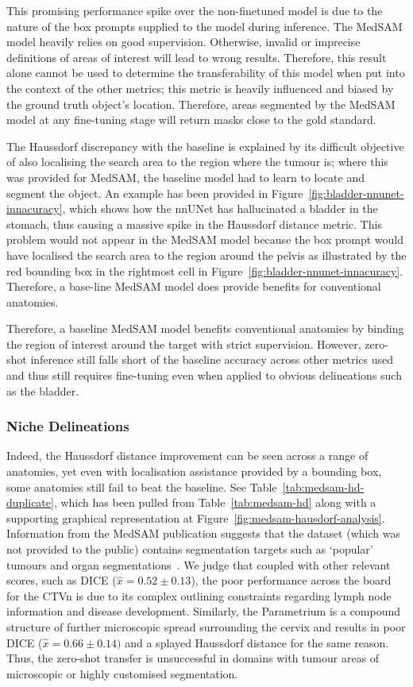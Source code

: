 \documentclass[11pt,twoside]{report}
\begin{document}
This promising performance spike over the non-finetuned model is due to the nature of the box prompts supplied to the model during inference. The MedSAM model heavily relies on good supervision. Otherwise, invalid or imprecise definitions of areas of interest will lead to wrong results. Therefore, this result alone cannot be used to determine the transferability of this model when put into the context of the other metrics; this metric is heavily influenced and biased by the ground truth object's location. Therefore, areas segmented by the MedSAM model at any fine-tuning stage will return masks close to the gold standard.

The Haussdorf discrepancy with the baseline is explained by its difficult objective of also localising the search area to the region where the tumour is; where this was provided for MedSAM, the baseline model had to learn to locate and segment the object. An example has been provided in Figure~\ref{fig:bladder-nnunet-innacuracy}, which shows how the nnUNet has hallucinated a bladder in the stomach, thus causing a massive spike in the Haussdorf distance metric. This problem would not appear in the MedSAM model because the box prompt would have localised the search area to the region around the pelvis as illustrated by the red bounding box in the rightmost cell in Figure~\ref{fig:bladder-nnunet-innacuracy}. Therefore, a base-line MedSAM model does provide benefits for conventional anatomies.


Therefore, a baseline MedSAM model benefits conventional anatomies by binding the region of interest around the target with strict supervision. However, zero-shot inference still falls short of the baseline accuracy across other metrics used and thus still requires fine-tuning even when applied to obvious delineations such as the bladder.

\subsubsection{Niche Delineations}

Indeed, the Haussdorf distance improvement can be seen across a range of anatomies, yet even with localisation assistance provided by a bounding box, some anatomies still fail to beat the baseline. See Table~\ref{tab:medsam-hd-duplicate}, which has been pulled from Table~\ref{tab:medsam-hd} along with a supporting graphical representation at Figure~\ref{fig:medsam-hausdorf-analysis}. Information from the MedSAM publication suggests that the dataset (which was not provided to the public) contains segmentation targets such as `popular' tumours and organ segmentations~\cite{Ma2024}. We judge that coupled with other relevant scores, such as DICE ($\hat{x} = 0.52 \pm 0.13$), the poor performance across the board for the CTVn is due to its complex outlining constraints regarding lymph node information and disease development. Similarly, the Parametrium is a compound structure of further microscopic spread surrounding the cervix and results in poor DICE ($\hat{x} = 0.66 \pm 0.14)$ and a splayed Haussdorf distance for the same reason. Thus, the zero-shot transfer is unsuccessful in domains with tumour areas of microscopic or highly customised segmentation. 
\end{document}
